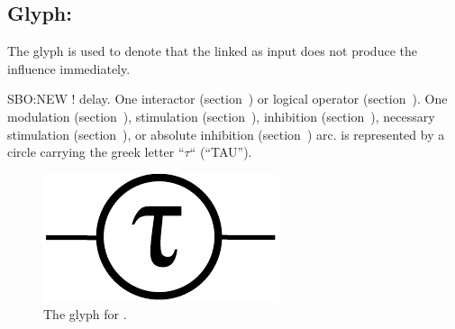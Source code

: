 \color{red}
\subsection{Glyph: }\label{sec:delay}

The glyph  is used to denote that the  linked as input does not produce the influence immediately.

\begin{glyphDescription}
 \glyphSboTerm SBO:NEW ! delay.
 \glyphOrigin One interactor (section~) or logical operator (section~).
 \glyphTarget  One modulation (section~), stimulation (section~), inhibition (section~), necessary  stimulation (section~), or absolute inhibition (section~) arc.
 \glyphNode {} is represented by a circle carrying the greek letter ``$\tau$`` (``TAU'').
 \end{glyphDescription}

\begin{figure}[H]
  \centering
  \includegraphics[scale = 0.5]{images/delay}
  \caption{The \ER glyph for .}
  \label{fig:delay}
\end{figure}

